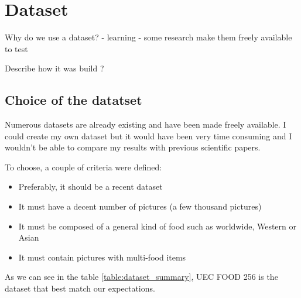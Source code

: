 \chapter{Dataset}

Why do we use a dataset?
- learning
- some research make them freely available to test

Describe how it was build ?

\section{Choice of the datatset}

Numerous datasets are already existing and have been made freely available. I could create my own dataset but it would have been very time consuming and I wouldn't be able to compare my results with previous scientific papers.

To choose, a couple of criteria were defined:
\begin{itemize}
    \item Preferably, it should be a recent dataset
    \item It must have a decent number of pictures (a few thousand pictures)
    \item It must be composed of a general kind of food such as worldwide, Western or Asian
    \item It must contain pictures with multi-food items
\end{itemize}

As we can see in the table \ref{table:dataset_summary}, UEC FOOD 256 is the dataset that best match our expectations.

